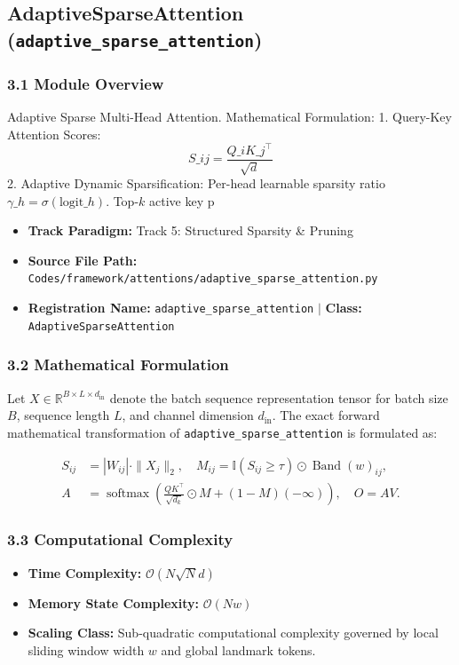\subsection{AdaptiveSparseAttention (\texttt{adaptive\_sparse\_attention})}
\label{sec:app_module_adaptive\_sparse\_attention}

\subsubsection*{3.1 Module Overview}
Adaptive Sparse Multi-Head Attention.  Mathematical Formulation:     1. Query-Key Attention Scores:        $$S\_{ij} = \frac{Q\_i K\_j^\top}{\sqrt{d}}$$          2. Adaptive Dynamic Sparsification:        Per-head learnable sparsity ratio $\gamma\_h = \sigma(\text{logit}\_h)$.        Top-$k$ active key p
\begin{itemize}
    \item \textbf{Track Paradigm:} Track 5: Structured Sparsity & Pruning
    \item \textbf{Source File Path:} \texttt{Codes/framework/attentions/adaptive\_sparse\_attention.py}
    \item \textbf{Registration Name:} \texttt{adaptive\_sparse\_attention} $\mid$ \textbf{Class:} \texttt{AdaptiveSparseAttention}
\end{itemize}

\subsubsection*{3.2 Mathematical Formulation}
Let $X \in \mathbb{R}^{B \times L \times d_{\text{in}}}$ denote the batch sequence representation tensor for batch size $B$, sequence length $L$, and channel dimension $d_{\text{in}}$. The exact forward mathematical transformation of \texttt{adaptive\_sparse\_attention} is formulated as:

\begin{align}
S_{ij} &= |W_{ij}| \cdot \|X_j\|_2, \quad M_{ij} = \mathbb{I}(S_{ij} \ge \tau) \odot \operatorname{Band}(w)_{ij}, \\
A &= \operatorname{softmax}\left(\frac{Q K^\top}{\sqrt{d_k}} \odot M + (1 - M)(-\infty)\right), \quad O = A V.
\end{align}


\subsubsection*{3.3 Computational Complexity}
\begin{itemize}
    \item \textbf{Time Complexity:} $\mathcal{O}(N \sqrt{N} d)$
    \item \textbf{Memory State Complexity:} $\mathcal{O}(N w)$
    \item \textbf{Scaling Class:} Sub-quadratic computational complexity governed by local sliding window width $w$ and global landmark tokens.
\end{itemize}

